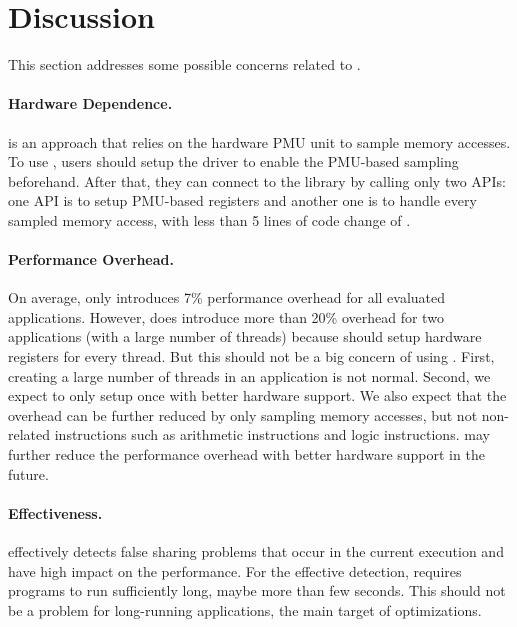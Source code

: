 \section{Discussion}

\label{sec:discuss}

This section addresses some possible concerns related to \Cheetah{}. 

\paragraph{Hardware Dependence.} \cheetah{} is an approach that relies on the hardware PMU unit to sample memory accesses. To use \cheetah{}, users should setup the driver to enable the PMU-based sampling beforehand. After that, they can connect to the \cheetah{} library by calling only two APIs: one API is to setup PMU-based registers and another one is to handle every sampled memory access, with less than 5 lines of code change of \cheetah{}. 

\paragraph{Performance Overhead.} On average, \Cheetah{} only introduces 7\% performance overhead for all evaluated applications. However, \cheetah{} does introduce more than 20\% overhead for two applications (with a large number of threads) because \cheetah{} should setup hardware registers for every thread. But this should not be a big concern of using \cheetah{}. First, creating a large number of threads in an application is not normal. Second, we expect to only setup once with better hardware support. We also expect that the overhead can be further reduced by only sampling memory accesses, but not non-related instructions such as arithmetic instructions and logic instructions.  \cheetah{} may further reduce the performance overhead with better hardware support in the future.

\paragraph{Effectiveness.} \Cheetah{} effectively detects false sharing problems that occur in the current execution and have high impact on the performance. For the effective detection, \Cheetah{} requires programs to run sufficiently long, maybe more than few seconds. This should not be a problem for long-running applications, the main target of optimizations. 

